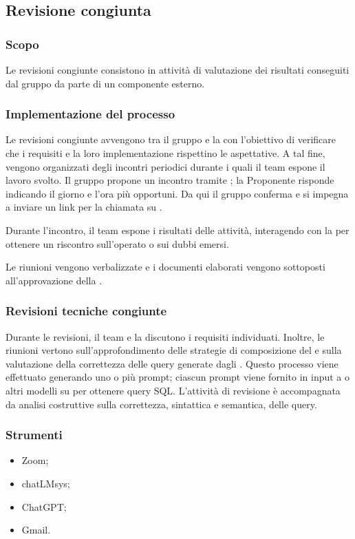 \subsection{Revisione congiunta}\label{revisione_congiunta}

\subsubsection{Scopo}
\par Le revisioni congiunte consistono in attività di valutazione dei risultati conseguiti dal gruppo da parte di un componente esterno.

\subsubsection{Implementazione del processo}
\par Le revisioni congiunte avvengono tra il gruppo e la  con l'obiettivo di verificare che i requisiti e la loro implementazione rispettino le aspettative. A tal fine, vengono organizzati degli incontri periodici durante i quali il team espone il lavoro svolto. Il gruppo propone un incontro tramite ; la Proponente risponde indicando il giorno e l'ora più opportuni. Da qui il gruppo conferma e si impegna a inviare un link per la chiamata su .
\par Durante l'incontro, il team espone i risultati delle attività, interagendo con la  per ottenere un riscontro sull'operato o sui dubbi emersi.
\par Le riunioni vengono verbalizzate e i documenti elaborati vengono sottoposti all'approvazione della .

\subsubsection{Revisioni tecniche congiunte}
\par Durante le revisioni, il team e la  discutono i requisiti individuati. Inoltre, le riunioni vertono sull'approfondimento delle strategie di composizione del  e sulla valutazione della correttezza delle query generate dagli . Questo processo viene effettuato generando uno o più prompt; ciascun prompt viene fornito in input a  o altri modelli su  per ottenere query SQL. L'attività di revisione è accompagnata da analisi costruttive sulla correttezza, sintattica e semantica, delle query.

\subsubsection{Strumenti}
\IntroStrumenti
\begin{itemize}
    \item Zoom;
    \item chatLMsys;
    \item ChatGPT;
    \item Gmail.
\end{itemize}